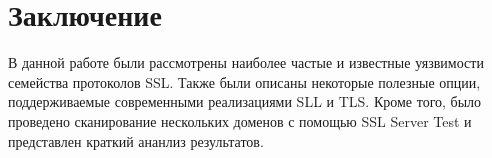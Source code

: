 \section{Заключение}

В данной работе были рассмотрены наиболее частые и известные уязвимости семейства протоколов SSL. Также были описаны некоторые полезные
опции, поддерживаемые современными реализациями SLL и TLS. Кроме того, было проведено сканирование нескольких доменов с помощью SSL 
Server Test и представлен краткий ананлиз результатов. 